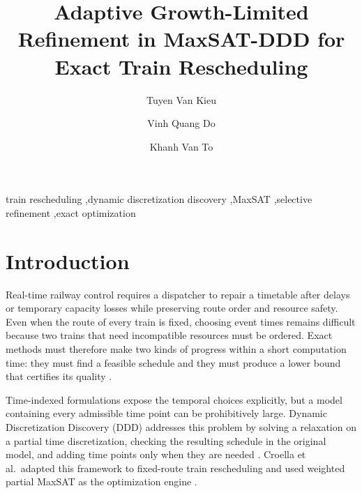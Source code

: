 \documentclass[preprint,12pt,authoryear]{elsarticle}
\begin{document}
\begin{frontmatter}

\title{Adaptive Growth-Limited Refinement in MaxSAT-DDD for Exact Train Rescheduling}

\author[vnu]{Tuyen Van Kieu}

\author[vnu]{Vinh Quang Do}

\author[vnu]{Khanh Van To}


\begin{abstract}
\end{abstract}

\begin{keyword}
train rescheduling \sep dynamic discretization discovery \sep MaxSAT
\sep selective refinement \sep exact optimization
\end{keyword}

\end{frontmatter}

\section{Introduction}
\label{sec:introduction}

Real-time railway control requires a dispatcher to repair a timetable after
delays or temporary capacity losses while preserving route order and resource
safety. Even when the route of every train is fixed, choosing event times
remains difficult because two trains that need incompatible resources must be
ordered. Exact methods must therefore make two kinds of progress within a
short computation time: they must find a feasible schedule and they must
produce a lower bound that certifies its quality
\citep{Cacchiani2014,Lamorgese2018}.

Time-indexed formulations expose the temporal choices explicitly, but a model
containing every admissible time point can be prohibitively large. Dynamic
Discretization Discovery (DDD) addresses this problem by solving a relaxation
on a partial time discretization, checking the resulting schedule in the
original model, and adding time points only when they are needed
\citep{Boland2017}. Croella et al.\ adapted this framework to fixed-route train
rescheduling and used weighted partial MaxSAT as the optimization engine
\citep{Croella2024}.
\end{document}
